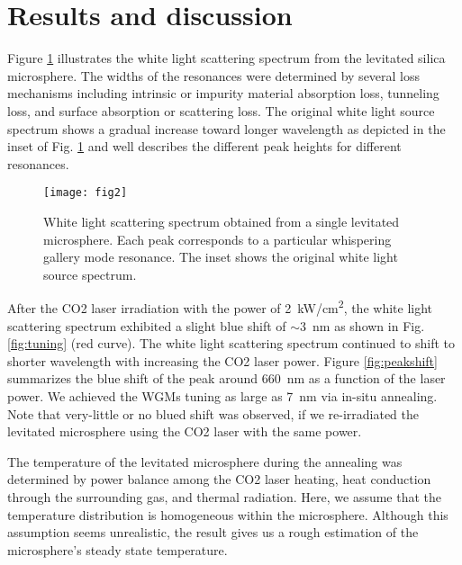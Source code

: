\documentclass[aps,prl,preprint,groupedaddress]{revtex4-1}
\begin{document}
\section{Results and discussion}
\label{sec:result}
Figure \ref{fig:wgm} illustrates the white light scattering spectrum from the levitated silica microsphere. The widths of the resonances were determined by several loss mechanisms including intrinsic or impurity material absorption loss, tunneling loss, and surface absorption or scattering loss. The original white light source spectrum shows a gradual increase toward longer wavelength as depicted in the inset of Fig. \ref{fig:wgm} and well describes the different peak heights for different resonances. 

\begin{figure}[htbp]
\centering
\texttt{[image: fig2]}
\caption{White light scattering spectrum obtained from a single levitated microsphere. Each peak corresponds to a particular whispering gallery mode resonance. The inset shows the original white light source spectrum.}
\label{fig:wgm}
\end{figure}


After the CO2 laser irradiation with the power of \SI{2}{kW/cm^2}, the white light scattering spectrum exhibited a slight blue shift of $\sim$\SI{3}{nm} as shown in Fig. \ref{fig:tuning} (red curve). The white light scattering spectrum continued to shift to shorter wavelength with increasing the CO2 laser power. Figure \ref{fig:peakshift}
summarizes the blue shift of the peak around \SI{660}{nm} as a function of the laser power. We achieved the WGMs tuning as large as \SI{7}{nm} via in-situ annealing. Note that very-little or no blued shift was observed, if we re-irradiated the levitated microsphere using the CO2 laser with the same power.

The temperature of the levitated microsphere during the annealing was determined by power balance among the CO2 laser heating, heat conduction through the surrounding gas, and thermal radiation. Here, we assume that the temperature distribution is homogeneous within the microsphere. Although this assumption seems unrealistic\cite{millen_nanoscale_2014}, the result gives us a rough estimation of the microsphere's steady state temperature.
\end{document}
